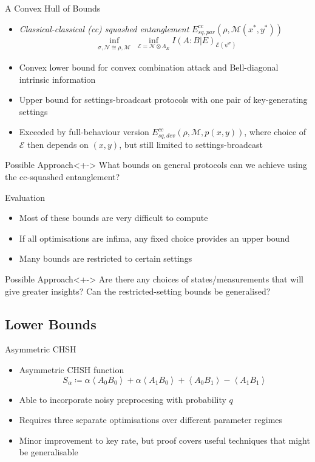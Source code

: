 \documentclass[xcolor=dvipsnames]{beamer}
\newcommand{\?}{\mathrel{?}} %
\newcommand{\angleb}[1]{\left\langle #1 \right\rangle} %
\newcommand{\sM}{\mathcal{M}}
\newcommand{\sN}{\mathcal{N}}
\newcommand{\cE}{\mathcal{E}}
\begin{document}
\begin{frame}{A Convex Hull of Bounds}
  \begin{itemize}[<+->]
    \item \emph{Classical-classical (cc) squashed entanglement} \(E^{cc}_{sq,par}(\rho, \sM(x^*, y^*))\)
      \[ \inf_{\substack{\sigma, \sN \cong \rho, \sM}} \inf_{\cE = \sN \otimes \Lambda_E} I{(A : B|E)}_{\cE(\psi^{\sigma})} \]
    \item Convex lower bound for convex combination attack and Bell-diagonal intrinsic information
    \item Upper bound for settings-broadcast protocols with one pair of key-generating settings
    \item Exceeded by full-behaviour version \(E^{cc}_{sq,dev}(\rho, \sM, p(x,y))\), where choice of \(\cE\) then depends on \((x,y)\), but still limited to settings-broadcast
  \end{itemize}

  \begin{block}{Possible Approach}<+->
      What bounds on general protocols can we achieve using the cc-squashed entanglement?
  \end{block}
\end{frame}

\begin{frame}{Evaluation}
  \begin{itemize}[<+->]
    \item Most of these bounds are very difficult to compute
    \item If all optimisations are infima, any fixed choice provides an upper bound
    \item Many bounds are restricted to certain settings
  \end{itemize}

  \begin{block}{Possible Approach}<+->
      Are there any choices of states/measurements that will give greater insights? Can the restricted-setting bounds be generalised?
  \end{block}
\end{frame}

\subsection{Lower Bounds}

\begin{frame}{Asymmetric CHSH}
  \begin{itemize}[<+->]
    \item Asymmetric CHSH function
      \[ S_{\alpha} \coloneqq \alpha\angleb{A_0 B_0} + \alpha\angleb{A_1 B_0} + \angleb{A_0 B_1} - \angleb{A_1 B_1} \]
    \item Able to incorporate noisy preprocesing with probability \(q\)
    \item Requires three separate optimisations over different parameter regimes
    \item Minor improvement to key rate, but proof covers useful techniques that might be generalisable
  \end{itemize}
\end{frame}
\end{document}
